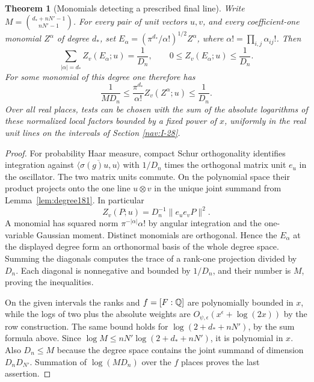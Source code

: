 \documentclass[a4paper,11pt]{article}
\newtheorem{theorem}[proposition]{Theorem}
\theoremstyle{definition}
\theoremstyle{remark}
\numberwithin{equation}{section}
\begin{document}
\begin{theorem}[Monomials detecting a prescribed final line]
\label{thm:line181}
Write \(M=\binom{d_*+nN'-1}{nN'-1}\). For every pair of
unit vectors \(u,v\), and every coefficient-one monomial
\(Z^\alpha\) of degree \(d_*\), set
\(E_\alpha=(\pi^{d_*}/\alpha !)^{1/2}Z^\alpha\), where
\(\alpha !=\prod_{i,j}\alpha_{ij}!\). Then
\[
  \sum_{|\alpha|=d_*}Z_v(E_\alpha;u)=\frac1{D_n},\qquad
 0\le Z_v(E_\alpha;u)\le\frac1{D_n}.
\]
For some monomial of this degree one therefore has
\begin{equation}
 \frac1{M D_n}
    \le \frac{\pi^{d_*}}{\alpha !} Z_v(Z^\alpha;u)
    \le\frac1{D_n}.                                      \label{eq:last181}
\end{equation}
Over all real places, tests can be chosen with the sum of
the absolute logarithms of these normalized local factors
bounded by a fixed power of \(x\), uniformly in the real
unit lines on the intervals of Section \ref{nav:I-28}.
\end{theorem}
\begin{proof}
For probability Haar measure, compact Schur orthogonality
identifies integration against
\(\overline{\langle\sigma(g)u,u\rangle}\) with \(1/D_n\)
times the orthogonal matrix unit \(e_u\) in the oscillator.
The two matrix units commute. On the polynomial space
their product projects onto the one line \(u\otimes v\)
in the unique joint summand from Lemma~\ref{lem:degree181}.
In particular
\[
 Z_v(P;u)=D_n^{-1}\|e_u e_v P\|^2.
\]
A monomial has squared norm \(\pi^{-|\alpha|}\alpha !\)
by angular integration and the one-variable Gaussian moment.
Distinct monomials are orthogonal. Hence the \(E_\alpha\)
at the displayed degree form an orthonormal basis of the
whole degree space. Summing the diagonals computes the
trace of a rank-one projection divided by \(D_n\).
Each diagonal is nonnegative and bounded by \(1/D_n\),
and their number is \(M\), proving the inequalities.

On the given intervals the ranks and \(f=[F:\mathbb Q]\) are
polynomially bounded in \(x\), while the logs of two plus
the absolute weights are \(O_{\psi,\epsilon}(x^\epsilon+
\log(2x))\) by the row construction. The same bound holds
for \(\log(2+d_*+nN')\), by the sum formula above. Since
\(\log M\le nN'\log(2+d_*+nN')\), it is polynomial in \(x\).
Also \(D_n\le M\) because the degree space contains the
joint summand of dimension \(D_nD_{N'}\). Summation of
\(\log(MD_n)\) over the \(f\) places proves the last assertion.
\end{proof}
\end{document}
